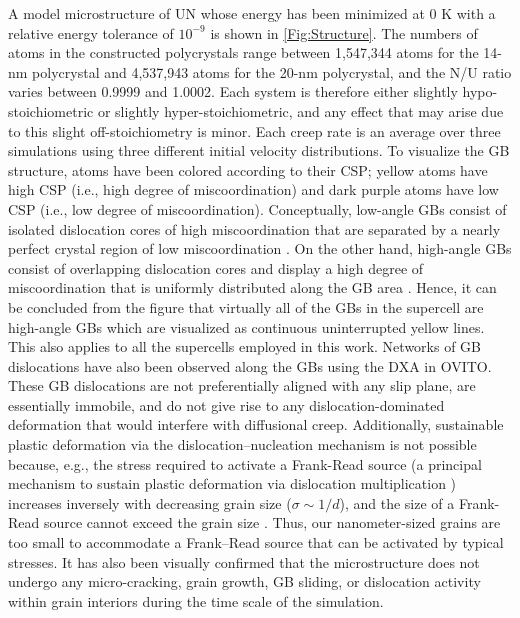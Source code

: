 \documentclass[preprint,12pt,sort&compress]{elsarticle}
\newcommand{\?}{\stackrel{?}{=}}
\begin{document}
A model microstructure of UN whose energy has been minimized at 0 K with a relative energy tolerance of $10^{-9}$ is shown in \cref{Fig:Structure}. The numbers of atoms in the constructed polycrystals range between 1,547,344 atoms for the 14-nm polycrystal and 4,537,943 atoms for the 20-nm polycrystal, and the N/U ratio varies between 0.9999 and 1.0002. Each system is therefore either slightly hypo-stoichiometric or slightly hyper-stoichiometric, and any effect that may arise due to this slight off-stoichiometry is minor. Each creep rate is an average over three simulations using three different initial velocity distributions. To visualize the GB structure, atoms have been colored according to their CSP; yellow atoms have high CSP (i.e., high degree of miscoordination) and dark purple atoms have low CSP (i.e., low degree of miscoordination). Conceptually, low-angle GBs consist of isolated dislocation cores of high miscoordination that are separated by a nearly perfect crystal region of low miscoordination \cite{Keblinski1999}. On the other hand, high-angle GBs consist of overlapping dislocation cores and display a high degree of miscoordination that is uniformly distributed along the GB area \cite{Haslam2004}. Hence, it can be concluded from the figure that virtually all of the GBs in the supercell are high-angle GBs which are visualized as continuous uninterrupted yellow lines. This also applies to all the supercells employed in this work. Networks of GB dislocations have also been observed along the GBs using the DXA in OVITO. These GB dislocations are not preferentially aligned with any slip plane, are essentially immobile, and do not give rise to any dislocation-dominated deformation that would interfere with diffusional creep. Additionally, sustainable plastic deformation via the dislocation–nucleation mechanism is not possible because, e.g., the stress required to activate a Frank-Read source (a principal mechanism to sustain plastic deformation via dislocation multiplication \cite{Murty2013}) increases inversely with decreasing grain size ($\sigma \sim 1/d$), and the size of a Frank-Read source cannot exceed the grain size \cite{Yamakov2001, Yamakov2002}. Thus, our nanometer-sized grains are too small to accommodate a Frank–Read source that can be activated by typical stresses. It has also been visually confirmed that the microstructure does not undergo any micro-cracking, grain growth, GB sliding, or dislocation activity within grain interiors during the time scale of the simulation.
\end{document}
